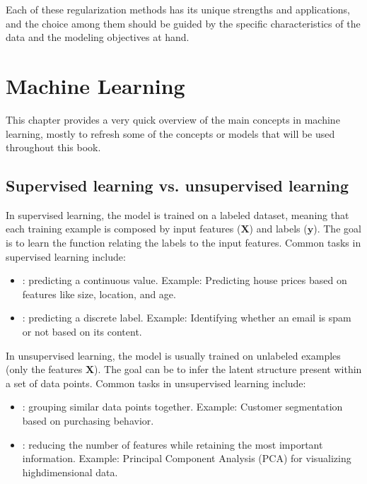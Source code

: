 \documentclass[letterpaper,10pt,english]{jupyterBook}
\begin{document}
\sphinxAtStartPar
Each of these regularization methods has its unique strengths and applications, and the choice among them should be guided by the specific characteristics of the data and the modeling objectives at hand.

\sphinxstepscope


\chapter{Machine Learning}
\label{\detokenize{notebooks/review_ML:machine-learning}}\label{\detokenize{notebooks/review_ML::doc}}
\sphinxAtStartPar
This chapter provides a very quick overview of the main concepts in machine learning, mostly to refresh some of the concepts or models that will be used throughout this book.


\section{Supervised learning vs. unsupervised learning}
\label{\detokenize{notebooks/review_ML:supervised-learning-vs-unsupervised-learning}}
\sphinxAtStartPar
In supervised learning, the model is trained on a labeled dataset, meaning that each training example is composed by input features (\(\mathbf{X}\)) and labels (\(\mathbf{y}\)). The goal is to learn the function relating the labels to the input features. Common tasks in supervised learning include:
\begin{itemize}
\item {} 
\sphinxAtStartPar
{}: predicting a continuous value. Example: Predicting house prices based on features like size, location, and age.

\item {} 
\sphinxAtStartPar
{}: predicting a discrete label. Example: Identifying whether an email is spam or not based on its content.

\end{itemize}

\sphinxAtStartPar
In unsupervised learning, the model is usually trained on unlabeled examples (only the features \(\mathbf{X}\)). The goal can be to infer the latent structure present within a set of data points. Common tasks in unsupervised learning include:
\begin{itemize}
\item {} 
\sphinxAtStartPar
{}: grouping similar data points together. Example: Customer segmentation based on purchasing behavior.

\item {} 
\sphinxAtStartPar
{}: reducing the number of features while retaining the most important information. Example: Principal Component Analysis (PCA) for visualizing high\sphinxhyphen{}dimensional data.

\end{itemize}
\end{document}
